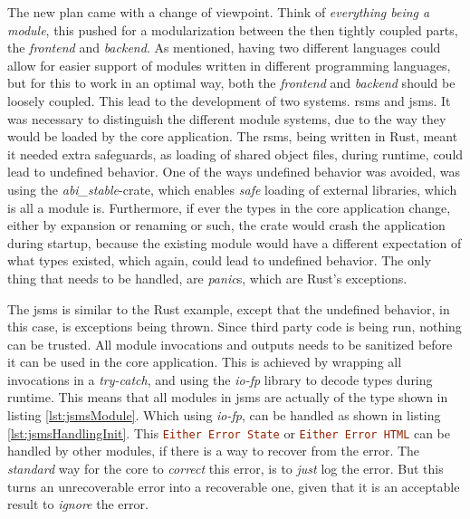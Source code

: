 The new plan came with a change of viewpoint. Think of
\textit{everything being a module}, this pushed for a modularization between the
then tightly coupled parts, the \textit{frontend} and \textit{backend}. As
mentioned, having two different languages could allow for easier support of
modules written in different programming languages, but for this to work in an
optimal way, both the \textit{frontend} and \textit{backend} should be loosely
coupled. This lead to the development of two systems. \gls{rsms} and \gls{jsms}.
It was necessary to distinguish the different module systems, due to the way
they would be loaded by the core application.
The \gls{rsms}, being written in Rust, meant it needed extra safeguards, as
loading of shared object files, during runtime, could lead to undefined
behavior.
One of the ways undefined behavior was avoided, was using the
\textit{abi\_stable}-crate, which enables \textit{safe} loading of external
libraries, which is all a module is.
Furthermore, if ever the types in the core application change, either by
expansion or renaming or such, the crate would crash the application during
startup, because the existing module would have a different expectation of what
types existed, which again, could lead to undefined behavior. The only thing
that needs to be handled, are \textit{panic}s, which are Rust's exceptions.

The \gls{jsms} is similar to the Rust example, except that the undefined
behavior, in this case, is exceptions being thrown. Since third party code is
being run, nothing can be trusted.
All module invocations and outputs needs to be sanitized before it can be used
in the core application. This is achieved by wrapping all invocations in a
\textit{try-catch}, and using the \textit{io-fp} library to decode types during
runtime. This means that all modules in \gls{jsms} are actually of the type
shown in listing \ref{lst:jsmsModule}. Which using \textit{io-fp}, can be
handled as shown in listing \ref{lst:jsmsHandlingInit}. This
\lstinline[language=Haskell]{Either Error State} or
\lstinline[language=Haskell]{Either Error HTML} can be handled by other modules,
if there is a way to recover from the error. The \textit{standard} way for the
core to \textit{correct} this error, is to \textit{just} log the error. But this
turns an unrecoverable error into a recoverable one, given that it is an
acceptable result to \textit{ignore} the error.

